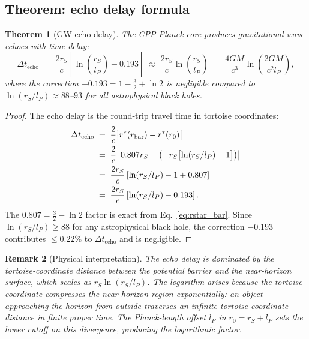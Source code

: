 \documentclass[12pt]{article}
\newtheorem{theorem}{Theorem}[section]
\newtheorem{remark}[theorem]{Remark}
\newcommand{\lP}{l_P}
\newcommand{\rS}{r_S}
\newcommand{\Dt}{\Delta t_{\mathrm{echo}}}
\newcommand{\rstar}{r^*}
\begin{document}
\subsection{Theorem: echo delay formula}

\begin{theorem}[GW echo delay]
\label{thm:echo}
The CPP Planck core produces gravitational wave echoes with time delay:
\begin{equation}
  \boxed{\Dt \;=\; \frac{2\rS}{c}\!\left[\ln\!\left(\frac{\rS}{\lP}\right)
  - 0.193\right]
  \;\approx\; \frac{2\rS}{c}\ln\!\left(\frac{\rS}{\lP}\right)
  \;=\; \frac{4GM}{c^3}\ln\!\left(\frac{2GM}{c^2\lP}\right),}
  \label{eq:delay}
\end{equation}
where the correction $-0.193 = 1 - \tfrac{3}{2} + \ln 2$ is negligible
compared to $\ln(\rS/\lP) \approx 88$--$93$ for all astrophysical black holes.
\end{theorem}

\begin{proof}
The echo delay is the round-trip travel time in tortoise coordinates:
\begin{align}
  \Dt &\;=\; \frac{2}{c}\bigl|\rstar(r_{\mathrm{bar}}) - \rstar(r_0)\bigr|
  \notag\\
  &\;=\; \frac{2}{c}\left|0.807\rS
  - \left(-\rS\bigl[\ln(\rS/\lP) - 1\bigr]\right)\right| \notag\\
  &\;=\; \frac{2\rS}{c}\left[\ln(\rS/\lP) - 1 + 0.807\right] \notag\\
  &\;=\; \frac{2\rS}{c}\left[\ln(\rS/\lP) - 0.193\right].
  \label{eq:proof_delay}
\end{align}
The $0.807 = \tfrac{3}{2} - \ln 2$ factor is exact from
Eq.~\eqref{eq:rstar_bar}.  Since $\ln(\rS/\lP) \geq 88$ for any
astrophysical black hole, the correction $-0.193$ contributes $\leq 0.22\%$
to $\Dt$ and is negligible.
\end{proof}

\begin{remark}[Physical interpretation]
The echo delay is dominated by the tortoise-coordinate distance between
the potential barrier and the near-horizon surface, which scales as
$\rS\ln(\rS/\lP)$.  The logarithm arises because the tortoise coordinate
compresses the near-horizon region exponentially: an object approaching
the horizon from outside traverses an infinite tortoise-coordinate distance
in finite proper time.  The Planck-length offset $\lP$ in $r_0 = \rS + \lP$
sets the lower cutoff on this divergence, producing the logarithmic factor.
\end{remark}
\end{document}
